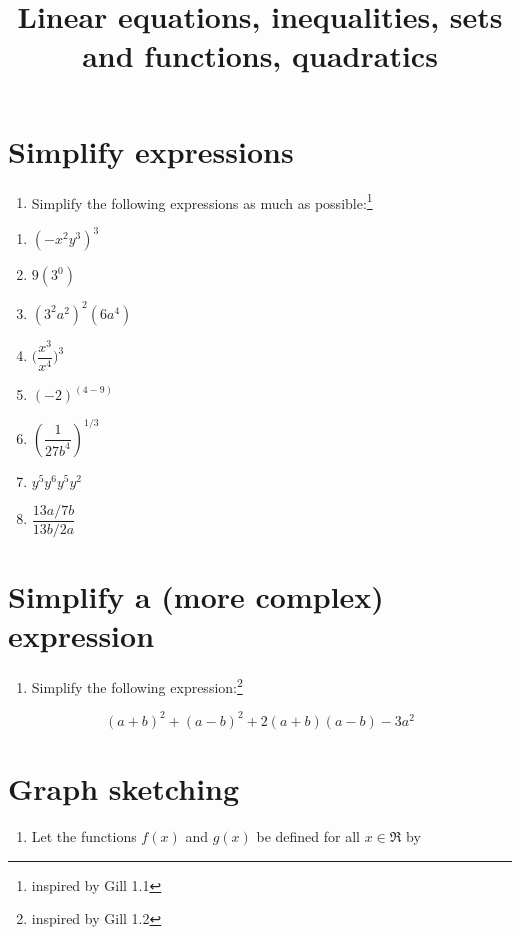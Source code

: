 \documentclass[
]{article}
\title{Linear equations, inequalities, sets and functions, quadratics}
\author{}
\date{\vspace{-2.5em}}
\providecommand{\tightlist}{%
  \setlength{\itemsep}{0pt}\setlength{\parskip}{0pt}}
\begin{document}
\maketitle

\section{Simplify expressions}\label{simplify-expressions}

\begin{enumerate}
\def\labelenumi{\arabic{enumi}.}
\tightlist
\item
  Simplify the following expressions as much as possible:\footnote{inspired
    by Gill 1.1}
\end{enumerate}

\begin{enumerate}
\def\labelenumi{\alph{enumi}.}
\item
  \((-x^2y^3)^3\)
\item
  \(9(3^0)\)
\item
  \((3^2a^2)^2(6a^4)\)
\item
  \(\Big(\dfrac{x^3}{x^4}\Big)^3\)
\item
  \((-2)^{(4-9)}\)
\item
  \(\left(\dfrac{1}{27b^4}\right)^{1/3}\)
\item
  \(y^5y^6y^5y^2\)
\item
  \(\dfrac{13a/7b}{13b/2a}\)
\end{enumerate}

\section{Simplify a (more complex)
expression}\label{simplify-a-more-complex-expression}

\begin{enumerate}
\def\labelenumi{\arabic{enumi}.}
\setcounter{enumi}{1}
\tightlist
\item
  Simplify the following expression:\footnote{inspired by Gill 1.2}
\end{enumerate}

\[(a+b)^2 + (a-b)^2 + 2(a+b)(a-b) - 3a^2\]

\section{Graph sketching}\label{graph-sketching}

\begin{enumerate}
\def\labelenumi{\arabic{enumi}.}
\setcounter{enumi}{2}
\tightlist
\item
  Let the functions \(f(x)\) and \(g(x)\) be defined for all
  \(x \in \Re\) by
\end{enumerate}
\end{document}
